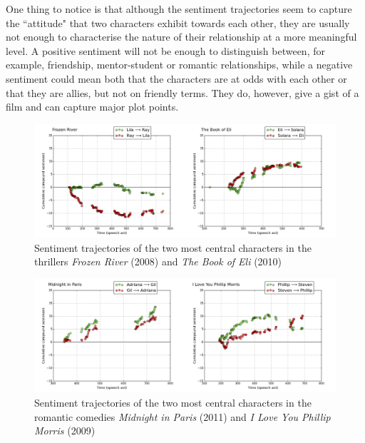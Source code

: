 \documentclass[bsc,frontabs,deptreport,singlespacing,parskip, twoside]{infthesis}
\begin{document}
One thing to notice is that although the sentiment trajectories seem to capture the ``attitude" that two characters exhibit towards each other, they are usually not enough to characterise the nature of their relationship at a more meaningful level. A positive sentiment will not be enough to distinguish between, for example, friendship, mentor-student or romantic relationships, while a negative sentiment could mean both that the characters are at odds with each other or that they are allies, but not on friendly terms. They do, however, give a gist of a film and can capture major plot points. 

\begin{figure}[h!]
\begin{adjustwidth}{-0.5in}{-0.5in}
	\centering
	\includegraphics[scale=0.43]{figures/y_thrillers}
	\caption{Sentiment trajectories of the two most central characters in the thrillers \textit{Frozen River} (2008) and \textit{The Book of Eli} (2010)}
	\label{fig:thrillers}
\end{adjustwidth}
\end{figure}

\begin{figure}[h!]
\begin{adjustwidth}{-0.5in}{-0.5in}
	\centering
	\includegraphics[scale=0.43]{figures/y_romcoms}
	\caption{Sentiment trajectories of the two most central characters in the romantic comedies \textit{Midnight in Paris} (2011) and \textit{I Love You Phillip Morris} (2009)}
	\label{fig:romcoms}
\end{adjustwidth}
\end{figure}
\end{document}
